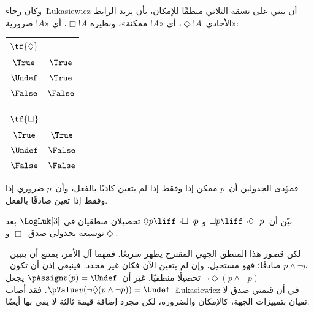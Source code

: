 \documentclass[../../../include/open-logic-section]{subfiles}
\begin{document}
وكان رجاء~\L ukasiewicz أن يبني على نسقه الثلاثي منطقًا للإمكان،
بأن يزيد الرابط الأحادي~$\Diamond !A$، أي «$!A$ ممكنة»، ونظيره
$\Box !A$، أي «$!A$ ضرورية»:
\begin{center}
  \begin{tabular}{c|c}
    $\tf{\Diamond}$ & \\
    \hline
    $\True$ & $\True$ \\
    $\Undef$ & $\True$ \\
    $\False$ & $\False$
  \end{tabular}
  \quad
  \begin{tabular}{c|c}
    $\tf{\Box}$ & \\
    \hline
    $\True$ & $\True$ \\
    $\Undef$ & $\False$ \\
    $\False$ & $\False$
  \end{tabular}
\end{center}
فمؤدى الجدولين أن~$p$ ممكن إذا وفقط إذا لم يتعين كاذبًا بالفعل،
وأن~$p$ ضروري إذا وفقط إذا تعين صادقًا بالفعل.

\begin{prob}
  بيّن أن~$\Box p \liff \lnot\Diamond \lnot p$ و
  $\Diamond p \liff \lnot \Box \lnot p$ تحصيلان منطقيان في
  $\LogLuk[3]$ بعد توسيعه بجدولي صدق~$\Box$ و$\Diamond$.
\end{prob}

لكن قصور هذا المنطق الجهي المقترح يظهر سريعًا. فمهما آل الأمر، يمتنع
أن يتبين~$p \land \lnot p$ صادقًا؛ فهو مستحيل، وإن لم يتعين الآن
فكان غير محدد. فينبغي إذن أن تكون~$\lnot \Diamond(p \land \lnot p)$
تحصيلًا منطقيًا. غير أن~$\pAssign v(p) = \Undef$ يجعل
$\pValue v(\lnot \Diamond(p \land \lnot p)) = \Undef$.
فقد أصاب~\L ukasiewicz في أن قيمتي صدق لا تفيان بتمييزات الجهة،
كالإمكان والضرورة، لكن مجرد إضافة قيمة ثالثة لا يفي بها أيضًا.
\end{document}
